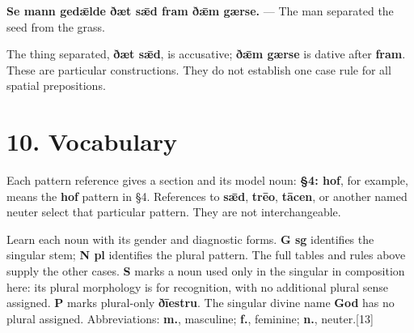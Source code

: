 \textbf{Se mann gedǣlde ðæt sǣd fram ðǣm gærse.} — The man separated the seed from the grass.

The thing separated, \textbf{ðæt sǣd}, is accusative; \textbf{ðǣm gærse} is dative after \textbf{fram}. These are particular constructions. They do not establish one case rule for all spatial prepositions.

\section*{10. Vocabulary}

Each pattern reference gives a section and its model noun: \textbf{§4: hof}, for example, means the \textbf{hof} pattern in §4. References to \textbf{sǣd}, \textbf{trēo}, \textbf{tācen}, or another named neuter select that particular pattern. They are not interchangeable.

Learn each noun with its gender and diagnostic forms. \textbf{G sg} identifies the singular stem; \textbf{N pl} identifies the plural pattern. The full tables and rules above supply the other cases. \textbf{S} marks a noun used only in the singular in composition here: its plural morphology is for recognition, with no additional plural sense assigned. \textbf{P} marks plural-only \textbf{ðīestru}. The singular divine name \textbf{God} has no plural assigned. Abbreviations: \textbf{m.}, masculine; \textbf{f.}, feminine; \textbf{n.}, neuter.[13]

